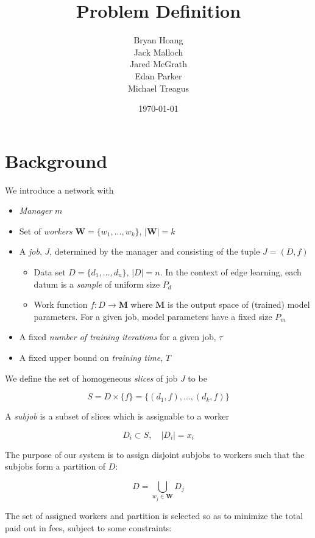 \documentclass[
    draft,
    final,
]{article}
\title{\textbf{Problem Definition}}
\author{
    Bryan Hoang\\
    Jack Malloch\\
    Jared McGrath\\
    Edan Parker\\
    Michael Treagus
}
\date{\today}
\begin{document}
    \maketitle
    \thispagestyle{empty}
    \newpage
    
    \section{Background}
    
    We introduce a network with
    
    \begin{itemize}
        \item \textit{Manager} $m$
        \item Set of \textit{workers} $\mathbf{W} = \{w_1, ..., w_k\}$, $\vert\mathbf{W}\vert = k$
        \item A \textit{job}, $J$, determined by the manager and consisting of the tuple $J = (D, f)$
            \begin{itemize}
                \item Data set $D = \{d_1, ..., d_n\}$, $\vert D\vert = n$. In the context of edge learning, each datum is a \textit{sample} of uniform size $P_d$
                \item Work function $f: D \rightarrow \mathbf{M}$ where $\mathbf{M}$ is the output space of (trained) model parameters. For a given job, model parameters have a fixed size $P_m$
            \end{itemize}
        \item A fixed \textit{number of training iterations} for a given job, $\tau$
        \item A fixed upper bound on \textit{training time}, $T$
    \end{itemize}
    
    We define the set of homogeneous \textit{slices} of job $J$ to be 
    
    \[S = D \times \{f\} = \{(d_1, f), ..., (d_k, f)\}\]
    
    A \textit{subjob} is a subset of slices which is assignable to a worker
    
    \[D_i \subset S, \quad \vert D_i \vert = x_i\]
    
    The purpose of our system is to assign disjoint subjobs to workers such that the subjobs form a partition of $D$:
    
    \[D = \bigcup\limits_{w_j \in \mathbf{W}} D_j\]
    
    The set of assigned workers and partition is selected so as to minimize the total paid out in fees, subject to some constraints:
    
\end{document}
